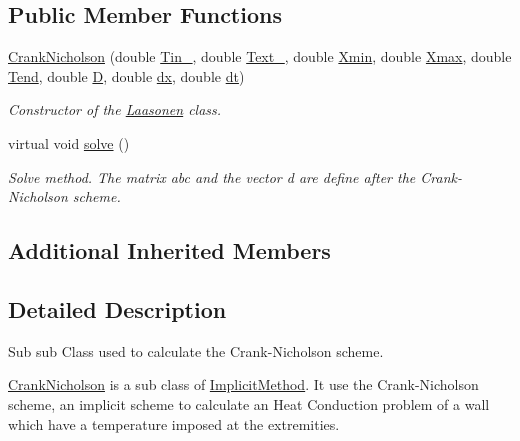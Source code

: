 \subsection*{Public Member Functions}
\begin{DoxyCompactItemize}
\item 
\hyperlink{class_crank_nicholson_ac14a4b871ca88ddc37e85990f16a3904}{Crank\+Nicholson} (double \hyperlink{class_heat_conduction_a2487010bf67582643ff59c0c5167725e}{Tin\+\_}, double \hyperlink{class_heat_conduction_aeb50fb3189fd6545f765ef73c9be7889}{Text\+\_}, double \hyperlink{class_heat_conduction_a6ccf374e13ab91b2403db617c9e7a8f0}{Xmin}, double \hyperlink{class_heat_conduction_a187dd05134300536dd9b5418e2957e9a}{Xmax}, double \hyperlink{class_heat_conduction_ab1d00caf79f4c04b420189eaf7c666e1}{Tend}, double \hyperlink{class_heat_conduction_a197d8aa3aa8619edaa640c243bdfc793}{D}, double \hyperlink{class_heat_conduction_a208bf1f475147b07a1f7d28533d78d9c}{dx}, double \hyperlink{class_heat_conduction_a7a7d5f6631039781c80b8c0c60e540e6}{dt})
\begin{DoxyCompactList}\small\item\em Constructor of the \hyperlink{class_laasonen}{Laasonen} class. \end{DoxyCompactList}\item 
virtual void \hyperlink{class_crank_nicholson_a2846912cccce367888c37bf0e58f1cb1}{solve} ()
\begin{DoxyCompactList}\small\item\em Solve method. The matrix abc and the vector d are define after the Crank-\/\+Nicholson scheme. \end{DoxyCompactList}\end{DoxyCompactItemize}
\subsection*{Additional Inherited Members}


\subsection{Detailed Description}
Sub sub Class used to calculate the Crank-\/\+Nicholson scheme. 

\hyperlink{class_crank_nicholson}{Crank\+Nicholson} is a sub class of \hyperlink{class_implicit_method}{Implicit\+Method}. It use the Crank-\/\+Nicholson scheme, an implicit scheme to calculate an Heat Conduction problem of a wall which have a temperature imposed at the extremities. 

